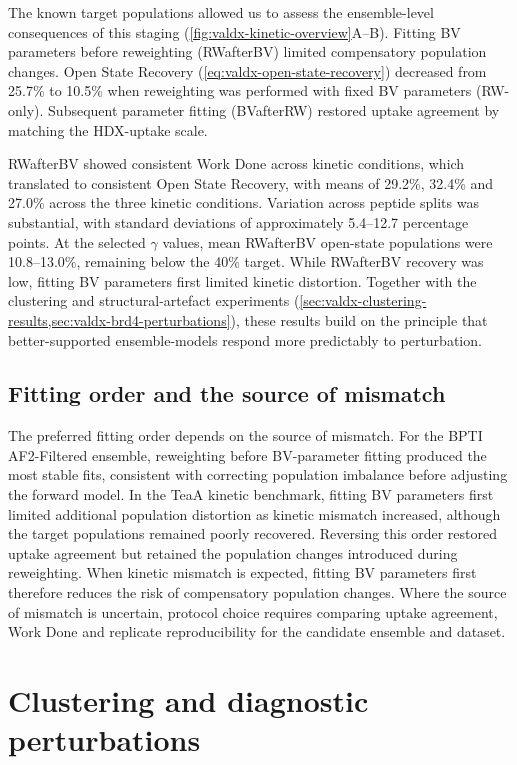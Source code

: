 The known target populations allowed us to assess the ensemble-level consequences of this staging (\cref{fig:valdx-kinetic-overview}A--B). Fitting BV parameters before reweighting (RWafterBV) limited compensatory population changes. Open State Recovery (\cref{eq:valdx-open-state-recovery}) decreased from 25.7\% to 10.5\% when reweighting was performed with fixed BV parameters (RW-only). Subsequent parameter fitting (BVafterRW) restored uptake agreement by matching the HDX-uptake scale.

RWafterBV showed consistent Work Done across kinetic conditions, which translated to consistent Open State Recovery, with means of 29.2\%, 32.4\% and 27.0\% across the three kinetic conditions. Variation across peptide splits was substantial, with standard deviations of approximately 5.4--12.7 percentage points. At the selected $\gamma$ values, mean RWafterBV open-state populations were 10.8--13.0\%, remaining below the 40\% target. While RWafterBV recovery was low, fitting BV parameters first limited kinetic distortion. Together with the clustering and structural-artefact experiments (\cref{sec:valdx-clustering-results,sec:valdx-brd4-perturbations}), these results build on the principle that better-supported ensemble-models respond more predictably to perturbation.

\subsection{Fitting order and the source of mismatch}
\label{sec:valdx-fitting-order}

The preferred fitting order depends on the source of mismatch. For the BPTI AF2-Filtered ensemble, reweighting before BV-parameter fitting produced the most stable fits, consistent with correcting population imbalance before adjusting the forward model. In the TeaA kinetic benchmark, fitting BV parameters first limited additional population distortion as kinetic mismatch increased, although the target populations remained poorly recovered. Reversing this order restored uptake agreement but retained the population changes introduced during reweighting. When kinetic mismatch is expected, fitting BV parameters first therefore reduces the risk of compensatory population changes. Where the source of mismatch is uncertain, protocol choice requires comparing uptake agreement, Work Done and replicate reproducibility for the candidate ensemble and dataset.

\section{Clustering and diagnostic perturbations}
\label{sec:valdx-perturbations}

